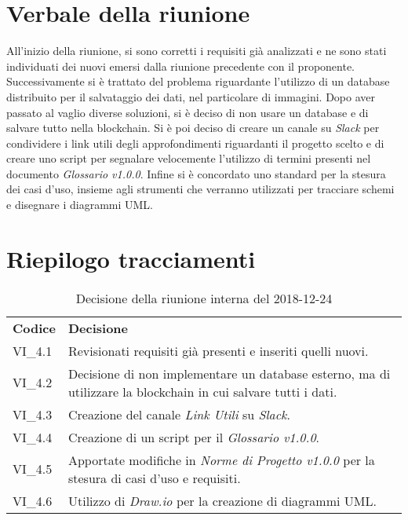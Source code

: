 \section{Verbale della riunione}
All'inizio della riunione, si sono corretti i requisiti già analizzati e ne sono 
stati individuati dei nuovi emersi dalla riunione precedente con il proponente.
Successivamente si è trattato del problema riguardante l'utilizzo di un database
distribuito per il salvataggio dei dati, nel particolare di immagini. Dopo aver
passato al vaglio diverse soluzioni, si è deciso di non usare un database e di 
salvare tutto nella blockchain\glo{}. \newline
Si è poi deciso di creare un canale su \textit{Slack} per condividere i link utili degli
approfondimenti riguardanti il progetto scelto e di creare uno script per segnalare
velocemente l'utilizzo di termini presenti nel documento \textit{Glossario v1.0.0}.
Infine si è concordato uno standard per la stesura dei casi d'uso, insieme agli 
strumenti che verranno utilizzati per tracciare schemi e disegnare i diagrammi UML.

\pagebreak

\section{Riepilogo tracciamenti}
\begin{table}[H]
	
	\begin{longtable}{ >{\centering}p{} >{\centering}p{}}
			
		\rowcolorhead
		\centering \textbf{\color{white}Codice} 
		& \centering \textbf{\color{white}Decisione} 
		
		\tabularnewline 
		VI\_4.1 & Revisionati requisiti già presenti e inseriti quelli nuovi.
		
		\tabularnewline 
		VI\_4.2 & Decisione di non implementare un database esterno, ma di utilizzare
					la blockchain in cui salvare tutti i dati.
		
		\tabularnewline 
		VI\_4.3 & Creazione del canale \textit{Link Utili} su \textit{Slack}.
	
		\tabularnewline 
		VI\_4.4 & Creazione di un script per il \textit{Glossario v1.0.0}.
		
		\tabularnewline
		VI\_4.5 & Apportate modifiche in \textit{Norme di Progetto v1.0.0} per la 
				stesura di casi d'uso e requisiti.
		
		\tabularnewline
		VI\_4.6 & Utilizzo di \textit{Draw.io} per la creazione di diagrammi UML.
					
	
	\end{longtable}
	\caption{Decisione della riunione interna del 2018-12-24}	

\end{table}



